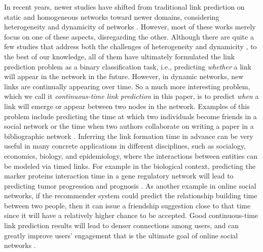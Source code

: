 In recent years, newer studies have shifted from traditional link prediction on static and homogeneous networks toward newer domains, considering heterogeneity and dynamicity of networks \cite{dong2012link, davis2011multi, 7752228, hajibagheri2016leveraging, moradabadi2017novel}. However, most of these works merely focus on one of these aspects, disregarding the other. Although there are quite a few studies that address both the challenges of heterogeneity and dynamicity \cite{aggarwal2012dynamic, sett2017temporal}, to the best of our knowledge, all of them have ultimately formulated the link prediction problem as a binary classification task, i.e., predicting \emph{whether} a link will appear in the network in the future. However, in dynamic networks, new links are continually appearing over time. So a much more interesting problem, which we call it \emph{continuous-time link prediction} in this paper, is to predict \emph{when} a link will emerge or appear between two nodes in the network. Examples of this problem include predicting the time at which two individuals become friends in a social network or the time when two authors collaborate on writing a paper in a bibliographic network \cite{sun2012will}. Inferring the link formation time in advance can be very useful in many concrete applications {\color{red}in different disciplines, such as socialogy, economics, biology, and epidemiology, where the interactions between entities can be modeled via timed links}. For example in the biological context, predicting the marker proteins interaction time in a gene regulatory network will lead to predicting tumor progression and prognosis \cite{taylor2009dynamic}. As another example in online social networks, if the recommender system could predict the relationship building time between two people, then it can issue a friendship suggestion close to that time since it will have a relatively higher chance to be accepted. Good continuous-time link prediction results will lead to denser connections among users, and can greatly improve users' engagement that is the ultimate goal of online social networks \cite{kwak2010twitter}.


